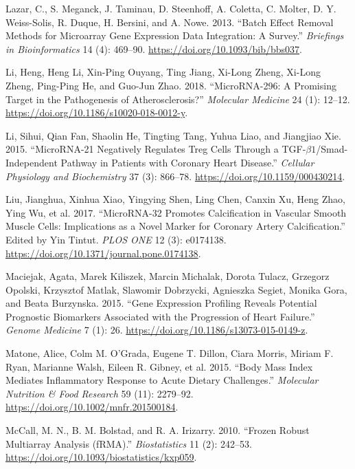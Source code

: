 \documentclass[smallextended]{svjour3}       %
\newlength{\cslhangindent}
\newlength{\cslentryspacingunit} %
\newenvironment{CSLReferences}[2] %
 {%
  \setlength{\parindent}{0pt}
  \ifodd #1
  \let\oldpar\par
  \def\par{\hangindent=\cslhangindent\oldpar}
  \fi
  \setlength{\parskip}{#2\cslentryspacingunit}
 }%
 {}
\begin{document}
\begin{CSLReferences}{1}{0}
\leavevmode{}%
Lazar, C., S. Meganck, J. Taminau, D. Steenhoff, A. Coletta, C. Molter,
D. Y. Weiss-Solis, R. Duque, H. Bersini, and A. Nowe. 2013. {``Batch
Effect Removal Methods for Microarray Gene Expression Data Integration:
A Survey.''} \emph{Briefings in Bioinformatics} 14 (4): 469--90.
\url{https://doi.org/10.1093/bib/bbs037}.

\leavevmode{}%
Li, Heng, Heng Li, Xin-Ping Ouyang, Ting Jiang, Xi-Long Zheng, Xi-Long
Zheng, Ping-Ping He, and Guo-Jun Zhao. 2018. {``{MicroRNA}-296: A
Promising Target in the Pathogenesis of Atherosclerosis?''}
\emph{Molecular Medicine} 24 (1): 12--12.
\url{https://doi.org/10.1186/s10020-018-0012-y}.

\leavevmode{}%
Li, Sihui, Qian Fan, Shaolin He, Tingting Tang, Yuhua Liao, and
Jiangjiao Xie. 2015. {``{MicroRNA}-21 {Negatively} {Regulates} {Treg}
{Cells} {Through} a {TGF}-\(\beta1\)/{Smad}-{Independent} {Pathway} in
{Patients} with {Coronary} {Heart} {Disease}.''} \emph{Cellular
Physiology and Biochemistry} 37 (3): 866--78.
\url{https://doi.org/10.1159/000430214}.

\leavevmode{}%
Liu, Jianghua, Xinhua Xiao, Yingying Shen, Ling Chen, Canxin Xu, Heng
Zhao, Ying Wu, et al. 2017. {``{MicroRNA}-32 Promotes Calcification in
Vascular Smooth Muscle Cells: {Implications} as a Novel Marker for
Coronary Artery Calcification.''} Edited by Yin Tintut. \emph{PLOS ONE}
12 (3): e0174138. \url{https://doi.org/10.1371/journal.pone.0174138}.

\leavevmode{}%
Maciejak, Agata, Marek Kiliszek, Marcin Michalak, Dorota Tulacz,
Grzegorz Opolski, Krzysztof Matlak, Slawomir Dobrzycki, Agnieszka
Segiet, Monika Gora, and Beata Burzynska. 2015. {``Gene Expression
Profiling Reveals Potential Prognostic Biomarkers Associated with the
Progression of Heart Failure.''} \emph{Genome Medicine} 7 (1): 26.
\url{https://doi.org/10.1186/s13073-015-0149-z}.

\leavevmode{}%
Matone, Alice, Colm M. O'Grada, Eugene T. Dillon, Ciara Morris, Miriam
F. Ryan, Marianne Walsh, Eileen R. Gibney, et al. 2015. {``Body Mass
Index Mediates Inflammatory Response to Acute Dietary Challenges.''}
\emph{Molecular Nutrition \& Food Research} 59 (11): 2279--92.
\url{https://doi.org/10.1002/mnfr.201500184}.

\leavevmode{}%
McCall, M. N., B. M. Bolstad, and R. A. Irizarry. 2010. {``Frozen Robust
Multiarray Analysis ({fRMA}).''} \emph{Biostatistics} 11 (2): 242--53.
\url{https://doi.org/10.1093/biostatistics/kxp059}.


\end{CSLReferences}
\end{document}
